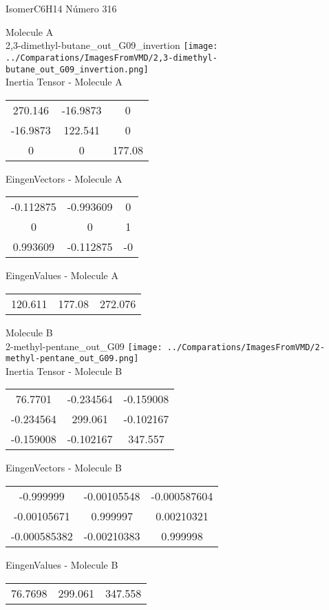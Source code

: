\vtab[-2cm]
\begin{center}
{\large IsomerC6H14 \tab Número 316}
\end{center}
\begin{multicols}{2}
\begin{center}

Molecule A \\ 
2,3-dimethyl-butane\_out\_G09\_invertion
\texttt{[image: ../Comparations/ImagesFromVMD/2,3-dimethyl-butane\_out\_G09\_invertion.png]}
\\
Inertia Tensor - Molecule A \\
\vtab

\begin{tabular}{|c c c|}
270.146	 & 	-16.9873	 & 	0	 \\
-16.9873	 & 	122.541	 & 	0	 \\
0	 & 	0	 & 	177.08
\end{tabular}

\vtab
 EingenVectors - Molecule A     \\
\vtab
\begin{tabular}{|c c c|}
-0.112875	 & 	-0.993609	 & 	0	 \\
0	 & 	0	 & 	1	 \\
0.993609	 & 	-0.112875	 & 	-0
\end{tabular}

\vtab
 EingenValues - Molecule A     \\
\vtab
\begin{tabular}{|c c c|}
120.611	 & 	177.08	 & 	272.076	 \\
\end{tabular}
\columnbreak

Molecule B \\ 
2-methyl-pentane\_out\_G09
\texttt{[image: ../Comparations/ImagesFromVMD/2-methyl-pentane\_out\_G09.png]}
\\
Inertia Tensor - Molecule B \\
\vtab

\begin{tabular}{|c c c|}
76.7701	 & 	-0.234564	 & 	-0.159008	 \\
-0.234564	 & 	299.061	 & 	-0.102167	 \\
-0.159008	 & 	-0.102167	 & 	347.557
\end{tabular}

\vtab
 EingenVectors - Molecule B     \\
\vtab
\begin{tabular}{|c c c|}
-0.999999	 & 	-0.00105548	 & 	-0.000587604	 \\
-0.00105671	 & 	0.999997	 & 	0.00210321	 \\
-0.000585382	 & 	-0.00210383	 & 	0.999998
\end{tabular}

\vtab
 EingenValues - Molecule B     \\
\vtab
\begin{tabular}{|c c c|}
76.7698	 & 	299.061	 & 	347.558	 \\
\end{tabular}

\end{center}
\end{multicols}
